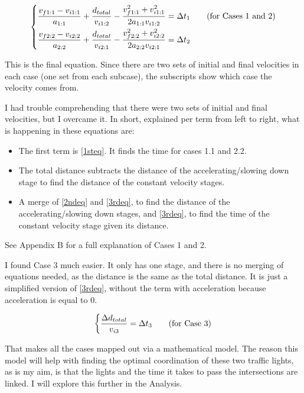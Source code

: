 \documentclass[11pt]{article}
\begin{document}
\begin{equation*}
\begin{dcases}
    \frac{v_{f1:1} - v_{i1:1}}{a_{1:1}} + \frac{d_{total}}{v_{i1:2}} - \frac{v_{f1:1}^2 + v_{i1:1}^2}{2a_{1:1}v_{i1:2}} = \Delta t_1 \tag{for Cases 1 and 2} \\
    \frac{v_{f2:2} - v_{i2:2}}{a_{2:2}} + \frac{d_{total}}{v_{i2:1}} - \frac{v_{f2:2}^2 + v_{i2:2}^2}{2a_{2:2}v_{i2:1}} = \Delta t_2 \\
\end{dcases}
\end{equation*}

This is the final equation. Since there are two sets of initial and final velocities in each case (one set from each subcase), the subscripts show which case the velocity comes from.

I had trouble comprehending that there were two sets of initial and final velocities, but I overcame it. In short, explained per term from left to right, what is happening in these equations are:

\begin{itemize}
    \item The first term is \eqref{1steq}. It finds the time for cases 1.1 and 2.2.
    \item The total distance subtracts the distance of the accelerating/slowing down stage to find the distance of the constant velocity stages.
    \item A merge of \eqref{2ndeq} and \eqref{3rdeq}, to find the distance of the accelerating/slowing down stages, and \eqref{3rdeq}, to find the time of the constant velocity stage given its distance.
\end{itemize}

See Appendix B for a full explanation of Cases 1 and 2.

I found Case 3 much easier. It only has one stage, and there is no merging of equations needed, as the distance is the same as the total distance. It is just a simplified version of \eqref{3rdeq}, without the term with acceleration because acceleration is equal to 0.

\begin{equation*}
\begin{dcases}
    \frac{\Delta d_{total}}{v_{i3}} = \Delta t_3 \tag{for Case 3}
\end{dcases}
\end{equation*}

That makes all the cases mapped out via a mathematical model. The reason this model will help with finding the optimal coordination of these two traffic lights, as is my aim, is that the lights and the time it takes to pass the intersections are linked. I will explore this further in the Analysis.
\end{document}
